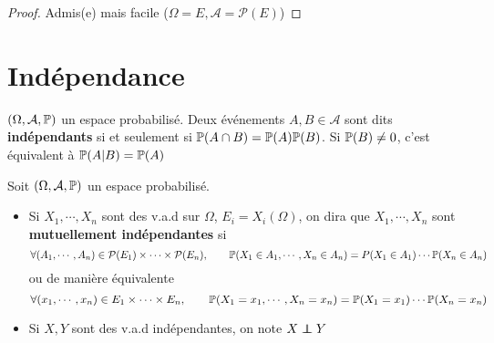 \begin{proof}
    Admis(e) mais facile ($\Omega=E, \mathcal A=\mathcal P(E)$)
\end{proof}

\section{Indépendance}

\begin{dfn}
    $(\Omega, \mathcal A, \P)$ un espace probabilisé. Deux événements $A,B\in \mathcal A$ sont dits \textbf{indépendants} si et seulement si $\P(A\cap B)=\P(A)\P(B)$. Si $\P(B)\neq 0$, c'est équivalent à $\P(A|B)=\P(A)$
\end{dfn}

\begin{dfn}
    Soit $(\Omega, \mathcal A, \P)$ un espace probabilisé. \begin{itemize}
        \item Si $X_1, \cdots, X_n$ sont des v.a.d sur $\Omega$, $E_i=X_i(\Omega)$, on dira que $X_1, \cdots,X_n$ sont \textbf{mutuellement indépendantes} si \[
                \forall (A_1,\cdots,A_n)\in \mathcal P(E_1)\times \cdots \times \mathcal P(E_n), \qquad \P(X_1\in  A_1,\cdots,X_n\in A_n)=P(X_1\in A_1)\cdots \P(X_n\in A_n)
        \] ou de manière équivalente \[
        \forall (x_1,\cdots,x_n)\in E_1\times \cdots \times E_n, \qquad \P(X_1=x_1,\cdots,X_n=x_n)=\P(X_1=x_1)\cdots \P(X_n=x_n)
        \] 
    \item Si $X, Y$ sont des v.a.d indépendantes, on note $X\indep Y$
    \end{itemize}
\end{dfn}

